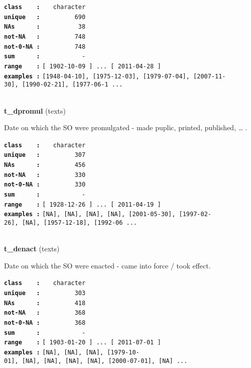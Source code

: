 \documentclass[]{article}
\begin{document}
\textbf{\texttt{class\ \ \ \ :}} \texttt{~~~character}\\
\textbf{\texttt{unique\ \ \ :}} \texttt{~~~~~~~~~690}\\
\textbf{\texttt{NAs\ \ \ \ \ \ :}} \texttt{~~~~~~~~~~38}\\
\textbf{\texttt{not-NA\ \ \ :}} \texttt{~~~~~~~~~748}\\
\textbf{\texttt{not-0-NA\ :}} \texttt{~~~~~~~~~748}\\
\textbf{\texttt{sum\ \ \ \ \ \ :}} \texttt{~~~~~~~~~~~-}\\
\textbf{\texttt{range\ \ \ \ :}}
\texttt{{[}\ 1902-10-09\ {]}\ ...\ {[}\ 2011-04-28\ {]}}\\
\textbf{\texttt{examples\ :}}
\texttt{{[}1948-04-10{]},\ {[}1975-12-03{]},\ {[}1979-07-04{]},\ {[}2007-11-30{]},\ {[}1990-02-21{]},\ {[}1977-06-1\ ...}\\

~

\textbf{t\_dpromul} (texts)

Date on which the SO were promulgated - made puplic, printed, published,
\ldots{} .

\textbf{\texttt{class\ \ \ \ :}} \texttt{~~~character}\\
\textbf{\texttt{unique\ \ \ :}} \texttt{~~~~~~~~~307}\\
\textbf{\texttt{NAs\ \ \ \ \ \ :}} \texttt{~~~~~~~~~456}\\
\textbf{\texttt{not-NA\ \ \ :}} \texttt{~~~~~~~~~330}\\
\textbf{\texttt{not-0-NA\ :}} \texttt{~~~~~~~~~330}\\
\textbf{\texttt{sum\ \ \ \ \ \ :}} \texttt{~~~~~~~~~~~-}\\
\textbf{\texttt{range\ \ \ \ :}}
\texttt{{[}\ 1928-12-26\ {]}\ ...\ {[}\ 2011-04-19\ {]}}\\
\textbf{\texttt{examples\ :}}
\texttt{{[}NA{]},\ {[}NA{]},\ {[}NA{]},\ {[}NA{]},\ {[}2001-05-30{]},\ {[}1997-02-26{]},\ {[}NA{]},\ {[}1957-12-18{]},\ {[}1992-06\ ...}\\

~

\textbf{t\_denact} (texts)

Date on which the SO were enacted - came into force / took effect.

\textbf{\texttt{class\ \ \ \ :}} \texttt{~~~character}\\
\textbf{\texttt{unique\ \ \ :}} \texttt{~~~~~~~~~303}\\
\textbf{\texttt{NAs\ \ \ \ \ \ :}} \texttt{~~~~~~~~~418}\\
\textbf{\texttt{not-NA\ \ \ :}} \texttt{~~~~~~~~~368}\\
\textbf{\texttt{not-0-NA\ :}} \texttt{~~~~~~~~~368}\\
\textbf{\texttt{sum\ \ \ \ \ \ :}} \texttt{~~~~~~~~~~~-}\\
\textbf{\texttt{range\ \ \ \ :}}
\texttt{{[}\ 1903-01-20\ {]}\ ...\ {[}\ 2011-07-01\ {]}}\\
\textbf{\texttt{examples\ :}}
\texttt{{[}NA{]},\ {[}NA{]},\ {[}NA{]},\ {[}1979-10-01{]},\ {[}NA{]},\ {[}NA{]},\ {[}NA{]},\ {[}NA{]},\ {[}2000-07-01{]},\ {[}NA{]}\ ...}\\
\end{document}
